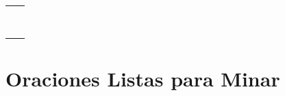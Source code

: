 \documentclass[12pt,a4paper]{article}
\begin{document}
\begin{cajachunk}
\begin{tabularx}{\textwidth}{@{} X l @{}}
\eng{Where is the ... ?} & \esp{¿Dónde está el/la ...?} \\
\eng{How do I get to ... ?} & \esp{¿Cómo llego a ...?} \\
\eng{Is it far from here?} & \esp{¿Está lejos de aquí?} \\
\eng{Turn left / right.} & \esp{Gira a la izquierda / derecha.} \\
\eng{Go straight ahead.} & \esp{Sigue derecho.} \\
\eng{It's next to the ...} & \esp{Está al lado del/de la ...} \\
\eng{I'm lost.} & \esp{Estoy perdido/a.} \\
\eng{Can you help me?} & \esp{¿Puedes ayudarme?} \\
\eng{I need a taxi, please.} & \esp{Necesito un taxi, por favor.} \\
\end{tabularx}
\end{cajachunk}

\section{Oraciones Listas para Minar}
\end{document}
